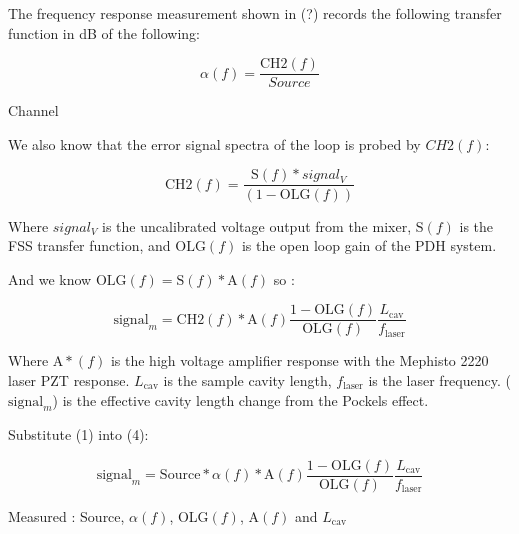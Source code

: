 The frequency response measurement shown in (?) records the following transfer function in dB of the following:

\begin{equation}
\alpha(f) = \frac{\mathrm{CH2}(f)}{Source}
\end{equation}

Channel

We also know that the error signal spectra of the loop is probed by $CH2(f)$:


\begin{equation}
\mathrm{CH2}(f) = \frac{\mathrm{S}(f)*signal_V}{(1-\mathrm{OLG}(f))}
\end{equation}

Where $signal_V$ is the uncalibrated voltage output from the mixer, $\mathrm{S}(f)$ is the FSS transfer function, and $\mathrm{OLG}(f)$ is the open loop gain of the PDH system.

And we know $\mathrm{OLG}(f) = \mathrm{S}(f)*\mathrm{A}(f)$ so :

\begin{equation}
\mathrm{signal}_m = \mathrm{CH2}(f)*\mathrm{A}(f) \frac{1-\mathrm{OLG}(f)}{\mathrm{OLG}(f)} \frac{L_\mathrm{cav}}{f_\mathrm{laser}}
\end{equation}

Where $\mathrm{A}*(f)$ is the high voltage amplifier response with the Mephisto 2220 laser PZT response. $L_\mathrm{cav}$ is the sample cavity length, $f_\mathrm{laser}$ is the laser frequency. ($\mathrm{signal}_m$)  is the effective cavity length change from the Pockels effect.

Substitute (1) into (4):

\begin{equation}
\mathrm{signal}_m = \mathrm{Source} * \alpha(f) * \mathrm{A}(f) \frac{1-\mathrm{OLG}(f)}{\mathrm{OLG}(f)} \frac{L_\mathrm{cav}}{f_\mathrm{laser}}
\end{equation}

Measured :
Source, $\alpha (f)$, OLG$(f)$, A$(f)$ and $L_\mathrm{cav}$

